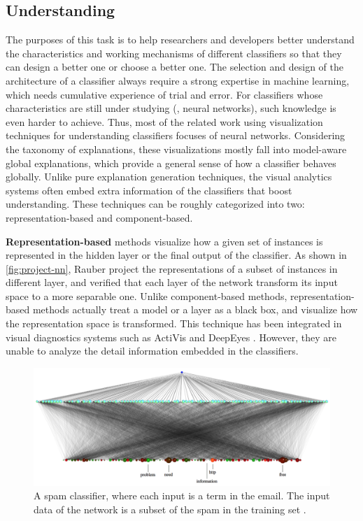 \subsection{Understanding}
The purposes of this task is to help researchers and developers better understand the characteristics and working mechanisms of different classifiers so that they can design a better one or choose a better one. The selection and design of the architecture of a classifier always require a strong expertise in machine learning, which needs cumulative experience of trial and error. For classifiers whose characteristics are still under studying (\eg, neural networks), such knowledge is even harder to achieve. Thus, most of the related work using visualization techniques for understanding classifiers focuses of neural networks. Considering the taxonomy of explanations, these visualizations mostly fall into model-aware global explanations, which provide a general sense of how a classifier behaves globally. Unlike pure explanation generation techniques, the visual analytics systems often embed extra information of the classifiers that boost understanding.
These techniques can be roughly categorized into two: representation-based and component-based.

\textbf{Representation-based} methods visualize how a given set of instances is represented in the hidden layer or the final output of the classifier. As shown in \autoref{fig:project-nn}, Rauber \etal \cite{rauber2017hidden-activity} project the representations of a subset of instances in different layer, and verified that each layer of the network transform its input space to a more separable one. Unlike component-based methods, representation-based methods actually treat a model or a layer as a black box, and visualize how the representation space is transformed. This technique has been integrated in visual diagnostics systems such as ActiVis \cite{kahng2017activis} and DeepEyes \cite{pezzotti2017deep-eyes}. However, they are unable to analyze the detail information embedded in the classifiers.

\begin{figure}
    \centering
    \includegraphics[width=1.0\textwidth]{figure/tzeng-nn}
    \caption{A spam classifier, where each input is a term in the email. The input data of the network is a subset of the spam in the training set \cite{tzeng2005visualize-nn}.}
    \label{fig:tzeng-nn}
\end{figure}

